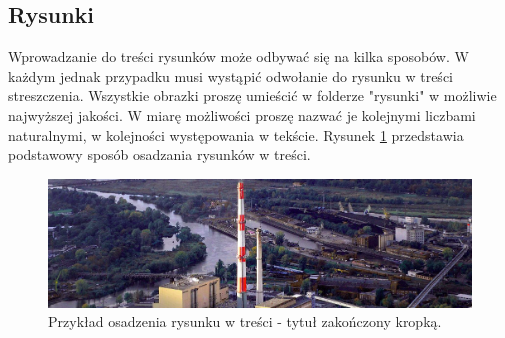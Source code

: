 \subsection{Rysunki}
Wprowadzanie do treści rysunków może odbywać się na kilka sposobów. W każdym jednak przypadku musi wystąpić odwołanie do rysunku w treści streszczenia. Wszystkie obrazki proszę umieścić w folderze "rysunki" w możliwie najwyższej jakości. W miarę możliwości proszę nazwać je kolejnymi liczbami naturalnymi, w kolejności występowania w tekście. Rysunek \ref{fig:nazwisko_1} przedstawia podstawowy sposób osadzania rysunków w treści.
\begin{figure}[H]
	\centering
	\includegraphics[width=\linewidth]{figures/1.png}
	\caption{Przykład osadzenia rysunku w treści - tytuł zakończony kropką. \label{fig:nazwisko_1}}
\end{figure}
